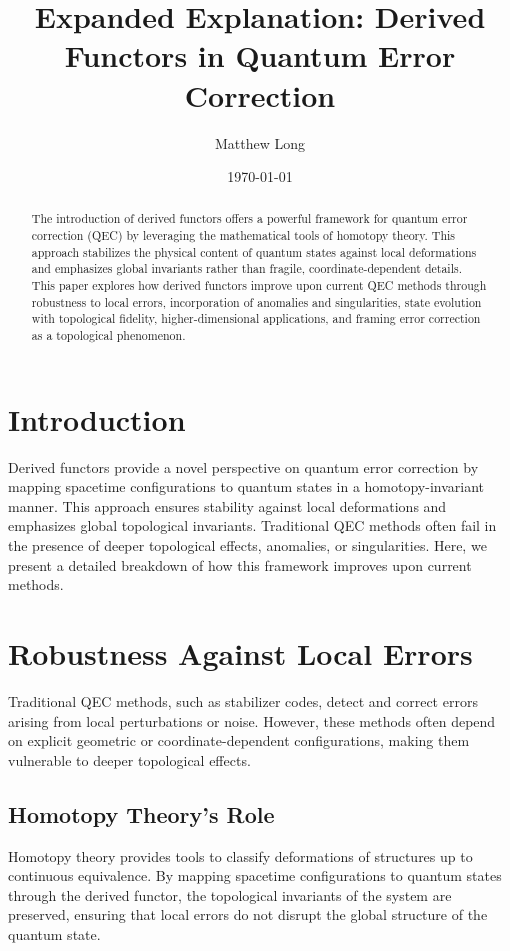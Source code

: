 \documentclass[11pt]{article}
\title{Expanded Explanation: Derived Functors in Quantum Error Correction}
\author{Matthew Long}
\date{\today}
\begin{document}
\maketitle

\begin{abstract}
The introduction of derived functors offers a powerful framework for quantum error correction (QEC) by leveraging the mathematical tools of homotopy theory. This approach stabilizes the physical content of quantum states against local deformations and emphasizes global invariants rather than fragile, coordinate-dependent details. This paper explores how derived functors improve upon current QEC methods through robustness to local errors, incorporation of anomalies and singularities, state evolution with topological fidelity, higher-dimensional applications, and framing error correction as a topological phenomenon.
\end{abstract}

\section{Introduction}
Derived functors provide a novel perspective on quantum error correction by mapping spacetime configurations to quantum states in a homotopy-invariant manner. This approach ensures stability against local deformations and emphasizes global topological invariants. Traditional QEC methods often fail in the presence of deeper topological effects, anomalies, or singularities. Here, we present a detailed breakdown of how this framework improves upon current methods.

\section{Robustness Against Local Errors}
Traditional QEC methods, such as stabilizer codes, detect and correct errors arising from local perturbations or noise. However, these methods often depend on explicit geometric or coordinate-dependent configurations, making them vulnerable to deeper topological effects.

\subsection{Homotopy Theory's Role}
Homotopy theory provides tools to classify deformations of structures up to continuous equivalence. By mapping spacetime configurations to quantum states through the derived functor, the topological invariants of the system are preserved, ensuring that local errors do not disrupt the global structure of the quantum state.
\end{document}
